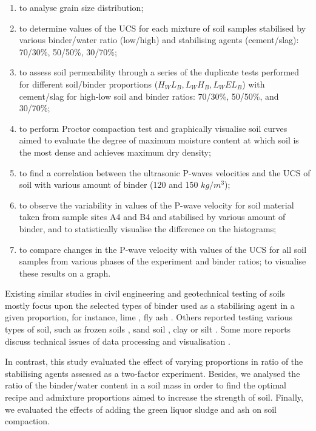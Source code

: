 \documentclass{amestyle}
\begin{document}
\begin{enumerate}
   \item to analyse grain size distribution;
   \item to determine values of the UCS for each mixture of soil samples stabilised by various binder/water ratio (low/high) and stabilising agents (cement/slag): 70/30\%, 50/50\%, 30/70\%; 
  \item to assess soil permeability through a series of the duplicate tests performed for different soil/binder proportions ($H_WL_B,L_WH_B,L_WEL_B$) with cement/slag for high-low soil and binder ratios: 70/30\%, 50/50\%, and 30/70\%;
  \item to perform Proctor compaction test and graphically visualise soil curves aimed to evaluate the degree of maximum moisture content at which soil is the most dense and achieves maximum dry density;
  \item to find a correlation between the ultrasonic P-waves velocities and the UCS of soil with various amount of binder (120 and 150 $kg/m^3$);
  \item to observe the variability in values of the P-wave velocity for soil material taken from sample sites A4 and B4 and stabilised by various amount of binder, and to statistically visualise the difference on the histograms;
  \item to compare changes in the P-wave velocity with values of the UCS for all soil samples from various phases of the experiment and binder ratios; to visualise these results on a graph.
\end{enumerate}

Existing similar studies in civil engineering and geotechnical testing of soils mostly focus upon the selected types of binder used as a stabilising agent in a given proportion, for instance, lime \cite{Rao,Mukhtar,Swaidani}, fly ash \cite{Phetchuay}. Others reported testing various types of soil, such as frozen soils \cite{Lemenkov2021b,Lemenkov2021c}, sand soil \cite{Robertson}, clay or silt \cite{Komal}. Some more reports discuss technical issues of data processing and visualisation \cite{Kaellenetal2014,Lemenkov2021c}. 

In contrast, this study evaluated the effect of varying proportions in ratio of the stabilising agents assessed as a two-factor experiment. Besides, we analysed the ratio of the binder/water content in a soil mass in order to find the optimal recipe and admixture proportions aimed to increase the strength of soil. Finally, we evaluated the effects of adding the green liquor sludge and ash on soil compaction. 
\end{document}
